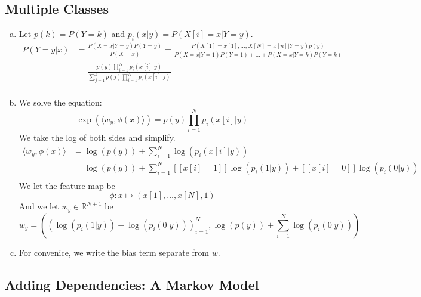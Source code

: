 \documentclass{amsart}
\newcommand{\rr}{\mathbb{R}}    %
\theoremstyle{definition}
\begin{document}
\subsection{Multiple Classes}
\begin{enumerate}[(a)]
	\item 
		Let $p(k) = P(Y = k)$ and $p_i(x|y) = P(X[i] = x|Y = y)$.
		\begin{align*}
			P(Y = y|x) &= \frac{P(X = x|Y = y) P(Y = y)}{P(X = x)} = \frac{P(X[1] = x[1], \ldots, X[N] = x[n]| Y = y)p(y)}{P(X=x|Y = 1) P(Y = 1) + \ldots + P(X=x| Y = k)P(Y=k)}\\
			&= \frac{p(y)\prod_{i=1}^{N}p_i(x[i]|y)}{\sum_{j=1}^{k} p(j)\prod_{i=1}^{N}p_i(x[i]|j)}\\
		\end{align*}
	\item
		We solve the equation:
		\[\exp(\langle w_y, \phi(x)\rangle) = p(y) \prod_{i=1}^{N}p_i(x[i]|y)\]
		We take the log of both sides and simplify.
		\begin{align*}
			\langle w_y, \phi(x)\rangle &= \log(p(y)) + \sum_{i=1}^{N} \log(p_i(x[i]|y))\\
			&= \log(p(y)) + \sum_{i=1}^{N} [[x[i] = 1]]\log(p_i(1|y)) + [[x[i] = 0]] \log(p_i(0|y))\\
		\end{align*}
		We let the feature map be 
		\[\phi: x \mapsto (x[1], \ldots, x[N], 1)\]
		And we let $w_y \in \rr^{N+1}$ be 
		\[w_y = \left((\log(p_i(1|y)) - \log(p_i(0|y)))_{i=1}^N, \log(p(y)) + \sum_{i=1}^{N} \log(p_i(0|y)) \right)\]
	\item 
		For convenice, we write the bias term separate from $w$.
\end{enumerate}
\subsection{Adding Dependencies: A Markov Model}
\end{document}
